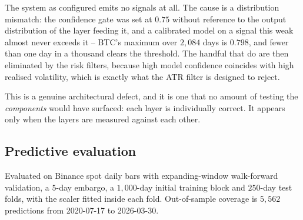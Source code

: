 \documentclass[preprint,12pt,authoryear]{elsarticle}
\begin{document}
The system as configured emits no signals at all. The cause is a distribution
mismatch: the confidence gate was set at $0.75$ without reference to the output
distribution of the layer feeding it, and a calibrated model on a signal this
weak almost never exceeds it -- BTC's maximum over $2{,}084$ days is $0.798$, and
fewer than one day in a thousand clears the threshold. The handful that do are
then eliminated by the risk filters, because high model confidence coincides with
high realised volatility, which is exactly what the ATR filter is designed to
reject.

This is a genuine architectural defect, and it is one that no amount of testing
the \emph{components} would have surfaced: each layer is individually correct.
It appears only when the layers are measured against each other.

\subsection{Predictive evaluation}
\label{ssec:predictive}

Evaluated on Binance spot daily bars with expanding-window walk-forward
validation, a $5$-day embargo, a $1{,}000$-day initial training block and
$250$-day test folds, with the scaler fitted inside each fold. Out-of-sample
coverage is $5{,}562$ predictions from 2020-07-17 to 2026-03-30.
\end{document}
